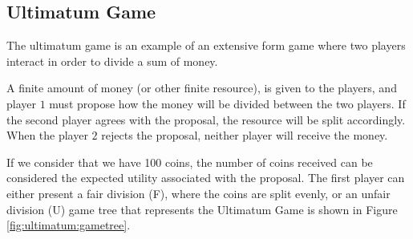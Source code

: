 \subsection{Ultimatum Game}
\label{subsec:ultimatumquantum}





The ultimatum game is an example of an extensive form game where two players interact in order to divide a sum of money.

A finite amount of money (or other finite resource), is given to the players, and player $1$ must propose how the money will be divided between the two players. If the second player agrees with the proposal, the resource will be split accordingly. When the player $2$ rejects the proposal, neither player will receive the money.

If we consider that we have 100 coins, the number of coins received can be considered the expected utility associated with the proposal. The first player can either present a fair division (F), where the coins are split evenly, or an unfair division (U) game tree that represents the Ultimatum Game is shown in Figure \ref{fig:ultimatum:gametree}.

